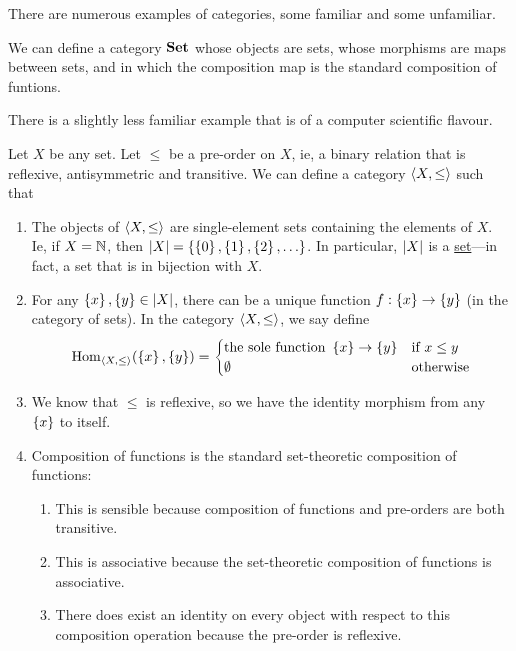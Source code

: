There are numerous examples of categories, some familiar and some unfamiliar.

\begin{boxexample}[Sets]
    We can define a category $\mathbf{Set}$ whose objects are sets, whose morphisms are maps between sets, and in which the composition map is the standard composition of funtions.
\end{boxexample}

There is a slightly less familiar example that is of a computer scientific flavour.

\begin{boxexample} %
    Let $X$ be any set. Let $\leq$ be a pre-order on $X$, ie, a binary relation that is reflexive, antisymmetric and transitive. We can define a category $\left\langle X, \le \right\rangle$ such that
    \begin{enumerate}
        \item The objects of $\left\langle X, \le \right\rangle$ are single-element sets containing the elements of $X$. Ie, if $X = \mathbb{N}$, then $\left\lvert X \right\rvert = \left\{ \left\{ 0 \right\}, \left\{ 1 \right\}, \left\{ 2 \right\}, \ldots \right\}$. In particular, $\left\lvert X \right\rvert$ is a \underline{set}---in fact, a set that is in bijection with $X$.
        \item For any $\left\{ x \right\}, \left\{ y \right\} \in \left\lvert X \right\rvert$, there can be a unique function $f : \left\{ x \right\} \to \left\{ y \right\}$ (in the category of sets). In the category $\left\langle X, \le \right\rangle$, we say define
        \begin{align*}
            \operatorname{Hom}_{\left\langle X, \le \right\rangle}\!\left( \left\{ x \right\}, \left\{ y \right\} \right) =
            \begin{cases}
                \text{the sole function } \left\{ x \right\} \to \left\{ y \right\} & \text{if } x \le y \\
                \emptyset & \text{otherwise}
            \end{cases}
        \end{align*}

        \item We know that $\le$ is reflexive, so we have the identity morphism from any $\left\{ x \right\}$ to itself.
        \item Composition of functions is the standard set-theoretic composition of functions:
        \begin{enumerate}[label = (\roman*)]
            \item This is sensible because composition of functions and pre-orders are both transitive.
            \item This is associative because the set-theoretic composition of functions is associative.
            \item There does exist an identity on every object with respect to this composition operation because the pre-order is reflexive.
        \end{enumerate}
    \end{enumerate}
\end{boxexample}

